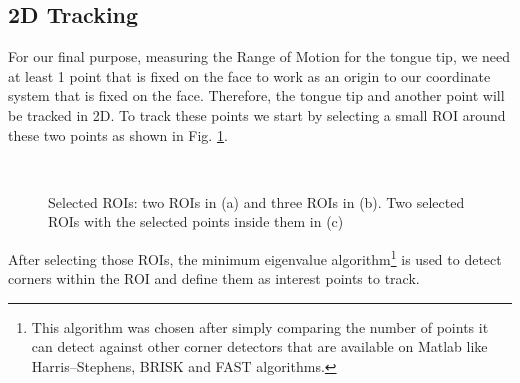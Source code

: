 \documentclass[journal]{IEEEtran}
\begin{document}
\subsection{2D Tracking}
For our final purpose, measuring the Range of Motion for the tongue tip, we need at least 1 point that is fixed on the face to work as an origin to our coordinate system that is fixed on the face. Therefore, the tongue tip and another point will be tracked in 2D.
To track these points we start by selecting a small ROI around these two points as shown in Fig. \ref{select2ROI}.
\begin{figure}[!t]
	\centering
{}
\hfill
{} 
\\
\caption{Selected ROIs: two ROIs in (a) and three ROIs in (b). Two selected ROIs with the selected points inside them in (c)}
\label{select2ROI}
\end{figure}
 After selecting those ROIs, the minimum eigenvalue algorithm\footnote{This algorithm was chosen after simply comparing the number of points it can detect against other corner detectors that are available on Matlab like Harris–Stephens, BRISK and FAST algorithms.} is used to detect corners within the ROI and define them as interest points to track.
 
\end{document}
